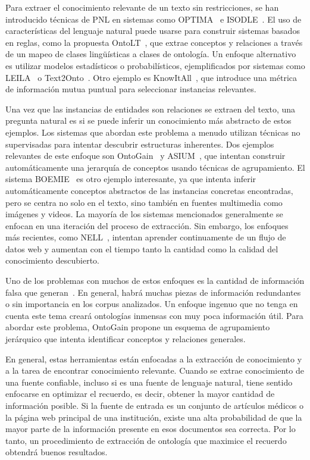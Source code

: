 Para extraer el conocimiento relevante de un texto sin restricciones, se han introducido técnicas de PNL en sistemas como OPTIMA~\cite{optima} e ISODLE~\cite{isolde}. El uso de características del lenguaje natural puede usarse para construir sistemas basados   en reglas, como la propuesta OntoLT~\cite{buitelaar2004ontolt}, que extrae conceptos y relaciones a través de un mapeo de clases lingüísticas a clases de ontología. Un enfoque alternativo es utilizar modelos estadísticos o probabilísticos, ejemplificados por sistemas como LEILA~\cite{leila} o Text2Onto~\cite{cimiano2005text2onto}. Otro ejemplo es KnowItAll~\cite{knowitall}, que introduce una métrica de información mutua puntual para seleccionar instancias relevantes.

Una vez que las instancias de entidades son relaciones se extraen del texto, una pregunta natural es si se puede inferir un conocimiento más abstracto de estos ejemplos. Los sistemas que abordan este problema a menudo utilizan técnicas no supervisadas para intentar descubrir estructuras inherentes. Dos ejemplos relevantes de este enfoque son OntoGain~\cite{drymonas2010unsupervised} y ASIUM~\cite{asium}, que intentan construir automáticamente una jerarquía de conceptos usando técnicas de agrupamiento. El sistema BOEMIE~\cite{boemie} es otro ejemplo interesante, ya que intenta inferir automáticamente conceptos abstractos de las instancias concretas encontradas, pero se centra no solo en el texto, sino también en fuentes multimedia como imágenes y videos. La mayoría de los sistemas mencionados generalmente se enfocan en una iteración del proceso de extracción. Sin embargo, los enfoques más recientes, como NELL~\cite{mitchell2015never}, intentan aprender continuamente de un flujo de datos web y aumentan con el tiempo tanto la cantidad como la calidad del conocimiento descubierto.

Uno de los problemas con muchos de estos enfoques es la cantidad de información falsa que generan~\cite{Maimon:2015:OLT:2870689.2870690}. En general, habrá muchas piezas de información redundantes o sin importancia en los corpus analizados. Un enfoque ingenuo que no tenga en cuenta este tema creará ontologías inmensas con muy poca información útil. Para abordar este problema, OntoGain propone un esquema de agrupamiento jerárquico que intenta identificar conceptos y relaciones generales.

En general, estas herramientas están enfocadas a la extracción de conocimiento y a la tarea de encontrar conocimiento relevante. Cuando se extrae conocimiento de una fuente confiable, incluso si es una fuente de lenguaje natural, tiene sentido enfocarse en optimizar el recuerdo, es decir, obtener la mayor cantidad de información posible. Si la fuente de entrada es un conjunto de artículos médicos o la página web principal de una institución, existe una alta probabilidad de que la mayor parte de la información presente en esos documentos sea correcta. Por lo tanto, un procedimiento de extracción de ontología que maximice el recuerdo obtendrá buenos resultados.

